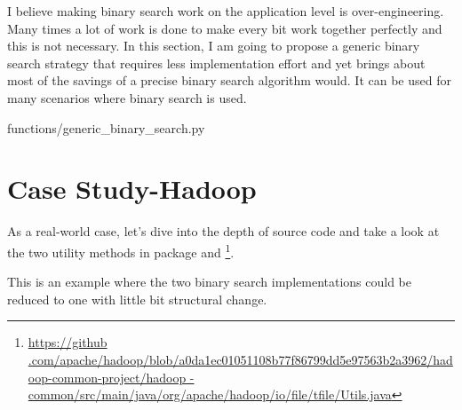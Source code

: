 I believe making binary search work on the application level is over-engineering.
Many times a lot of work is done to make every bit work together perfectly and this is not
necessary.
In this section, I am going to propose a generic binary search strategy that requires less
implementation effort and yet brings about most of the savings of a precise binary search algorithm
would.
It can be used for many scenarios where binary search is used.
\begin{clisting}
    
    {functions/generic_binary_search.py}
\end{clisting}


\section{Case Study-Hadoop}
As a real-world case, let's dive into the depth of  source code and take a look at
the two utility methods in package 
 and  \footnote{\url{https://github
.com/apache/hadoop/blob/a0da1ec01051108b77f86799dd5e97563b2a3962/hadoop-common-project/hadoop
-common/src/main/java/org/apache/hadoop/io/file/tfile/Utils.java}}.

This is an example where the two binary search implementations could be reduced to one with
little bit structural change.
